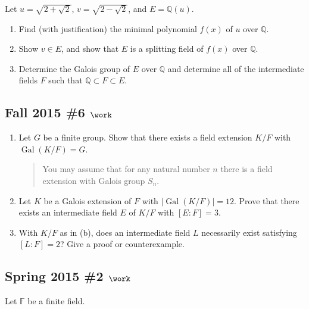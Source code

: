 Let \(u = \sqrt{2 + \sqrt{2}}\), \(v = \sqrt{2 - \sqrt{2}}\), and
\(E = {\mathbb{Q}}(u)\).

\begin{enumerate}
\def\labelenumi{\alph{enumi}.}
\item
  Find (with justification) the minimal polynomial \(f(x)\) of \(u\)
  over \({\mathbb{Q}}\).
\item
  Show \(v\in E\), and show that \(E\) is a splitting field of \(f(x)\)
  over \({\mathbb{Q}}\).
\item
  Determine the Galois group of \(E\) over \({\mathbb{Q}}\) and
  determine all of the intermediate fields \(F\) such that
  \({\mathbb{Q}}\subset F \subset E\).
\end{enumerate}

\hypertarget{fall-2015-6-work}{%
\subsection{\texorpdfstring{Fall 2015 \#6
\(\work\)}{Fall 2015 \#6 \textbackslash work}}\label{fall-2015-6-work}}

\begin{enumerate}
\def\labelenumi{\alph{enumi}.}
\item
  Let \(G\) be a finite group. Show that there exists a field extension
  \(K/F\) with \(\operatorname{Gal}(K/F) = G\).

  \begin{quote}
  You may assume that for any natural number \(n\) there is a field
  extension with Galois group \(S_n\).
  \end{quote}
\item
  Let \(K\) be a Galois extension of \(F\) with
  \({\left\lvert {\operatorname{Gal}(K/F)} \right\rvert} = 12\). Prove
  that there exists an intermediate field \(E\) of \(K/F\) with
  \([E: F] = 3\).
\item
  With \(K/F\) as in (b), does an intermediate field \(L\) necessarily
  exist satisfying \([L: F] = 2\)? Give a proof or counterexample.
\end{enumerate}

\hypertarget{spring-2015-2-work}{%
\subsection{\texorpdfstring{Spring 2015 \#2
\(\work\)}{Spring 2015 \#2 \textbackslash work}}\label{spring-2015-2-work}}

Let \({\mathbb{F}}\) be a finite field.

